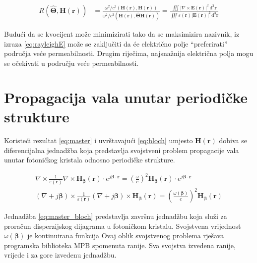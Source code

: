 \documentclass[utf8, seminar]{fer}
\begin{document}
\begin{align}
	R \left( \hat{\mathbf{\Theta}}, \mathbf{H}(\mathbf{r}) \right)
	&= \frac{
		\omega^2/c^2
		\left(
			\mathbf{H}(\mathbf{r}), \mathbf{H}(\mathbf{r})
		\right)
	}
	{
		\omega^2/c^2
		\left(
			\mathbf{H}(\mathbf{r}), \hat{\mathbf{\Theta}}\mathbf{H}(\mathbf{r})
		\right)
	}
	= \frac{
		\iiint |\nabla \times \mathbf{E}(\mathbf{r})|^2
		\, \mathrm{d}^3\mathbf{r}}
	{\iiint \varepsilon(\mathbf{r}) | \mathbf{E}( \mathbf{r} ) |^2
	\, \mathrm{d}^3\mathbf{r}} \label{eq:rayleighE}
\end{align}

Budući da se kvocijent može minimizirati tako da se maksimizira nazivnik, iz
izraza \ref{eq:rayleighE} može se zaključiti da će električno polje
``preferirati'' područja veće permeabilnosti. Drugim riječima,
najsnažnija električna polja mogu se očekivati u području veće permeabilnosti.

\section{Propagacija vala unutar periodičke strukture}

Koristeći rezultat \ref{eq:master} i uvrštavajući \ref{eq:bloch} umjesto
$\mathbf{H}(\mathbf{r})$ dobiva se diferencijalna jednadžba koja predstavlja
svojstveni problem propagacije vala unutar fotoničkog kristala odnosno
periodičke strukture.

\begin{align} \label{eq:master_bloch}
	\nabla \times
	\frac{1}{\varepsilon(\mathbf{r})} \nabla \times
	\mathbf{H}_{\bm{\beta}}(\mathbf{r}) \cdot
	e^{j {\bm{\beta}} \cdot \mathbf{r}}
	= \left(
		\frac{\omega}{c}
	\right)^2
	\mathbf{H}_{\bm{\beta}}(\mathbf{r}) \cdot
		e^{j {\bm{\beta}} \cdot \mathbf{r}}	\nonumber \\
	(\nabla + j{\bm{\beta}}) \times
	\frac{1}{\varepsilon(\mathbf{r})}
	(\nabla + j{\bm{\beta}}) \times
	\mathbf{H}_{\bm{\beta}}(\mathbf{r})
	= \left(
	\frac{\omega ({\bm{\beta}})}{c}
	\right)^2
	\mathbf{H}_{\bm{\beta}}(\mathbf{r})
\end{align}

Jednadžba \ref{eq:master_bloch} predstavlja završnu jednadžbu koja služi za
proračun disperzijskog dijagrama u fotoničkom kristalu. Svojstvena vrijednost
${\omega ({\bm{\beta}})}$ je kontinuirana funkcija
Ovaj oblik
svojstvenog problema rješava programska biblioteka MPB spomenuta ranije. Sva
svojstva izvedena ranije, vrijede i za gore izvedenu jednadžbu.
\end{document}
